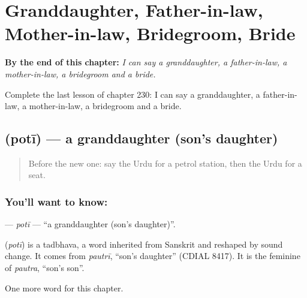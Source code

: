 
\chapter{Granddaughter, Father-in-law, Mother-in-law, Bridegroom, Bride}
\label{ch:ur-granddaughter-father-in-law-mother-in-law-bridegroom-bride}

\begin{chapteropening}
\textbf{By the end of this chapter:} \emph{I can say a granddaughter, a father-in-law, a mother-in-law, a bridegroom and a bride.}

Complete the last lesson of chapter 230: I can say a granddaughter, a father-in-law, a mother-in-law, a bridegroom and a bride.
\end{chapteropening}

\section[\texorpdfstring{\ur{پوتی} (potī)}{پوتی (potī)}]{ (potī) — a granddaughter (son's daughter)}

\label{lesson:UR-C230-poti}



\begin{quote}
Before the new one: say the Urdu for a petrol station, then the Urdu for a seat.
\end{quote}

\subsection*{You'll want to know: }
\textbf{} — \emph{potī} — \textquotedblleft{}a granddaughter (son's daughter)\textquotedblright{}.

\begin{cousinweb}
\textbf{} (\emph{potī}) is a tadbhava, a word inherited from Sanskrit and reshaped by sound change. It comes from \emph{pautrī}, \textquotedblleft{}son's daughter\textquotedblright{} (CDIAL 8417). It is the feminine of \emph{pautra}, \textquotedblleft{}son's son\textquotedblright{}.
\end{cousinweb}

\begin{grammarlens}[title={What you've built}]
One more word for this chapter.
\end{grammarlens}

